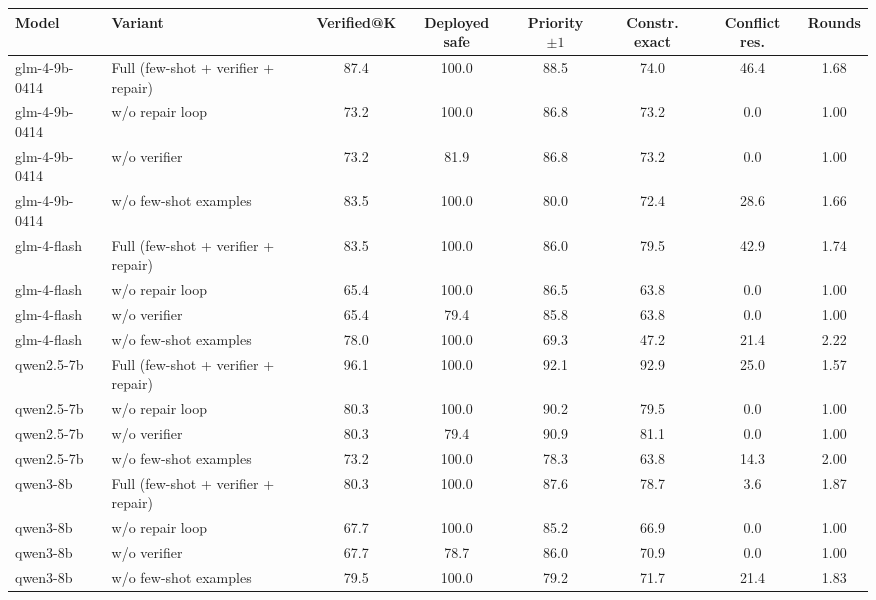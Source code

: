 \begin{tabular}{llcccccc}
\toprule
Model & Variant & Verified@K & Deployed safe & Priority $\pm1$ & Constr. exact & Conflict res. & Rounds \\
\midrule
glm-4-9b-0414 & Full (few-shot + verifier + repair) & 87.4 & 100.0 & 88.5 & 74.0 & 46.4 & 1.68 \\
glm-4-9b-0414 & w/o repair loop & 73.2 & 100.0 & 86.8 & 73.2 & 0.0 & 1.00 \\
glm-4-9b-0414 & w/o verifier & 73.2 & 81.9 & 86.8 & 73.2 & 0.0 & 1.00 \\
glm-4-9b-0414 & w/o few-shot examples & 83.5 & 100.0 & 80.0 & 72.4 & 28.6 & 1.66 \\
glm-4-flash & Full (few-shot + verifier + repair) & 83.5 & 100.0 & 86.0 & 79.5 & 42.9 & 1.74 \\
glm-4-flash & w/o repair loop & 65.4 & 100.0 & 86.5 & 63.8 & 0.0 & 1.00 \\
glm-4-flash & w/o verifier & 65.4 & 79.4 & 85.8 & 63.8 & 0.0 & 1.00 \\
glm-4-flash & w/o few-shot examples & 78.0 & 100.0 & 69.3 & 47.2 & 21.4 & 2.22 \\
qwen2.5-7b & Full (few-shot + verifier + repair) & 96.1 & 100.0 & 92.1 & 92.9 & 25.0 & 1.57 \\
qwen2.5-7b & w/o repair loop & 80.3 & 100.0 & 90.2 & 79.5 & 0.0 & 1.00 \\
qwen2.5-7b & w/o verifier & 80.3 & 79.4 & 90.9 & 81.1 & 0.0 & 1.00 \\
qwen2.5-7b & w/o few-shot examples & 73.2 & 100.0 & 78.3 & 63.8 & 14.3 & 2.00 \\
qwen3-8b & Full (few-shot + verifier + repair) & 80.3 & 100.0 & 87.6 & 78.7 & 3.6 & 1.87 \\
qwen3-8b & w/o repair loop & 67.7 & 100.0 & 85.2 & 66.9 & 0.0 & 1.00 \\
qwen3-8b & w/o verifier & 67.7 & 78.7 & 86.0 & 70.9 & 0.0 & 1.00 \\
qwen3-8b & w/o few-shot examples & 79.5 & 100.0 & 79.2 & 71.7 & 21.4 & 1.83 \\
\bottomrule
\end{tabular}